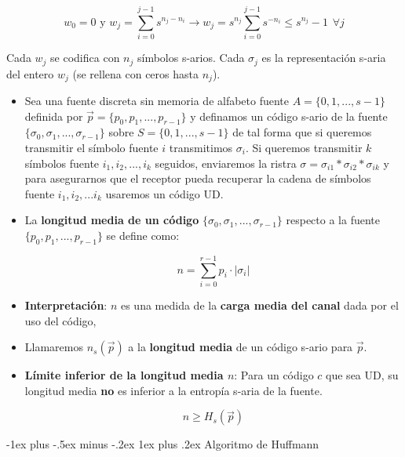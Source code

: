 \documentclass[10pt,landscape]{article}
\makeatletter
\renewcommand{\subsubsection}{\@startsection{subsubsection}{3}{0mm}%
                                {-1ex plus -.5ex minus -.2ex}%
                                {1ex plus .2ex}%
                                {\normalfont\small\bfseries}}
\makeatother
\begin{document}
\begin{multicols}{3}
\begin{equation*}
	w_0 = 0 \mbox{ y } w_j = \sum_{i = 0}^{j-1} s^{n_j - n_i} \rightarrow w_j = s^{n_j} \sum_{i = 0}^{j - 1} s^{-n_i} \leq s^{n_j} - 1 \hspace{5pt} \forall j
\end{equation*}

Cada $w_j$ se codifica con $n_j$ símbolos s-arios. Cada $\sigma_j$ es la representación s-aria del entero $w_j$ (se rellena con ceros hasta $n_j$).

\begin{itemize}
	\item Sea una fuente discreta sin memoria de alfabeto fuente $A = \{ 0, 1, ..., s-1 \}$ definida por $\vec{p} = \{ p_0, p_1, ..., p_{r-1} \}$ y definamos un código s-ario de la fuente $\{ \sigma_0, \sigma_1, ..., \sigma_{r-1} \}$ sobre $S = \{ 0, 1, ..., s-1 \}$ de tal forma que si queremos transmitir el símbolo fuente $i$ transmitimos $\sigma_i$. Si queremos transmitir $k$ símbolos fuente $i_1, i_2, ..., i_k$ seguidos, enviaremos la ristra $\sigma = \sigma_{i1} * \sigma_{i2} * \sigma_{ik}$ y para asegurarnos que el receptor pueda recuperar la cadena de símbolos fuente $i_1, i_2, ... i_k$ usaremos un código UD.
	\item La \textbf{longitud media de un código} $\{ \sigma_0, \sigma_1, ..., \sigma_{r-1} \} $ respecto a la fuente $\{ p_0, p_1, ..., p_{r-1} \}$ se define como: 

		\begin{equation*}
			n = \sum_{i=0}^{r-1} p_i \cdot | \sigma_i |
		\end{equation*}
	\item \textbf{Interpretación}: $n$ es una medida de la \textbf{carga media del canal} dada por el uso del código,
	\item Llamaremos $n_s(\vec{p})$ a la \textbf{longitud media} de un código s-ario para $\vec{p}$.
	\item \textbf{Límite inferior de la longitud media $n$}: Para un código $c$ que sea UD, su longitud media \textbf{no} es inferior a la entropía s-aria de la fuente.
	
		\begin{equation*}
			n \geq H_s(\vec{p})
		\end{equation*}
\end{itemize}

\subsubsection{Algoritmo de Huffmann}


\end{multicols}
\end{document}
